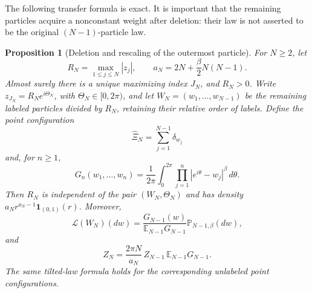 \documentclass[11pt,a4paper]{article}
\numberwithin{equation}{section}
\newtheorem{proposition}[theorem]{Proposition}
\theoremstyle{definition}
\theoremstyle{remark}
\newcommand{\E}{\mathbb E}
\newcommand{\Pbb}{\mathbb P}
\newcommand{\ind}{\mathbf 1}
\newcommand{\Law}{\mathcal L}
\begin{document}
The following transfer formula is exact. It is important that the
remaining particles acquire a nonconstant weight after deletion: their
law is not asserted to be the original $(N-1)$-particle law.

\begin{proposition}[Deletion and rescaling of the outermost particle]
\label{prop:outermost-transfer}
For $N\ge2$, let
\[
 R_N=\max_{1\le j\le N}|z_j|,
 \qquad
 a_N=2N+\frac\beta2N(N-1).
\]
Almost surely there is a unique maximizing index $J_N$, and $R_N>0$.
Write $z_{J_N}=R_Ne^{i\Theta_N}$, with
$\Theta_N\in[0,2\pi)$, and let $W_N=(w_1,\ldots,w_{N-1})$ be the
remaining labeled particles divided by $R_N$, retaining their relative
order of labels. Define the point configuration
\[
 \widehat\Xi_N=\sum_{j=1}^{N-1}\delta_{w_j}
\]
and, for $n\ge1$,
\begin{equation}\label{transfer:boundary-weight}
 G_n(w_1,\ldots,w_n)
 =\frac1{2\pi}\int_0^{2\pi}
   \prod_{j=1}^{n}|e^{i\theta}-w_j|^\beta\,d\theta.
\end{equation}
Then $R_N$ is independent of the pair $(W_N,\Theta_N)$ and has density
$a_N r^{a_N-1}\ind_{(0,1)}(r)$. Moreover,
\begin{equation}\label{transfer:tilted-law}
 \Law(W_N)(dw)
 =\frac{G_{N-1}(w)}{\E_{N-1}G_{N-1}}
     \Pbb_{N-1,\beta}(dw),
\end{equation}
and
\begin{equation}\label{transfer:partition-identity}
 Z_N=\frac{2\pi N}{a_N}\,Z_{N-1}\,\E_{N-1}G_{N-1}.
\end{equation}
The same tilted-law formula holds for the corresponding unlabeled point
configurations.
\end{proposition}
\end{document}

